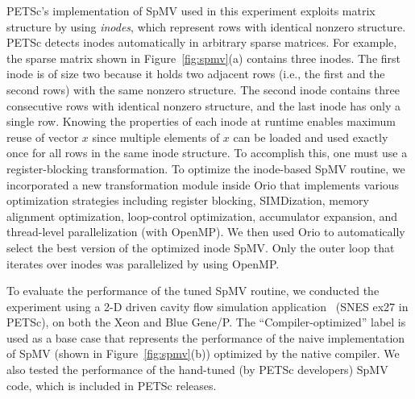 PETSc's implementation of SpMV used in this experiment exploits matrix
structure by using \textit{inodes}, which represent rows with identical
nonzero structure.  PETSc detects inodes automatically in arbitrary sparse
matrices. For example, the sparse matrix shown in Figure~\ref{fig:spmv}(a)
contains three inodes. The first inode is of size two because it holds two
adjacent rows (i.e., the first and the second rows) with the same nonzero
structure. The second inode contains three consecutive rows with identical
nonzero structure, and the last inode has only a single row. Knowing the
properties of each inode at runtime enables maximum reuse of vector $x$ since
multiple elements of $x$ can be loaded and used exactly once for all rows in
the same inode structure. To accomplish this, one must use a
register-blocking transformation. To optimize the inode-based SpMV routine,
we incorporated a new transformation module inside Orio that implements
various optimization strategies including register blocking, SIMDization,
memory alignment optimization, loop-control optimization, accumulator
expansion, and thread-level parallelization (with OpenMP). We then used Orio
to automatically select the best version of the optimized inode SpMV. Only
the outer loop that iterates over inodes was parallelized by using OpenMP.

To evaluate the performance of the tuned SpMV routine, we conducted the
experiment using a 2-D driven cavity flow simulation
application~\cite{coff:kell:keye} (SNES ex27 in PETSc), on both the Xeon and
Blue Gene/P. The ``Compiler-optimized'' label is used as a base case that
represents the performance of the naive implementation of SpMV (shown in
Figure~\ref{fig:spmv}(b)) optimized by the native compiler. We also tested
the performance of the hand-tuned (by PETSc developers) SpMV code, which is
included in PETSc releases.



